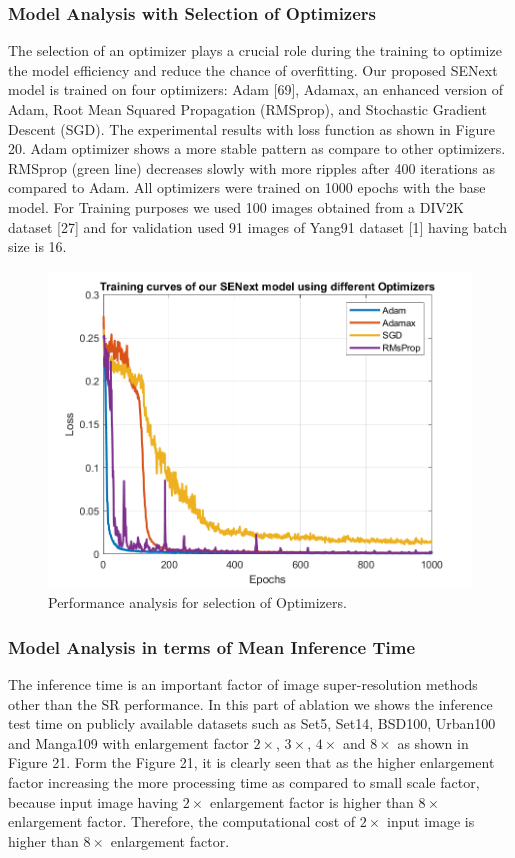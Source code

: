 \documentclass{ieeeaccess}
\begin{document}
\subsubsection{Model Analysis with Selection of Optimizers}
The selection of an optimizer plays a crucial role during the training to optimize the model efficiency and reduce the chance of overfitting. Our proposed SENext model is trained on four optimizers: Adam [69], Adamax, an enhanced version of Adam, Root Mean Squared Propagation (RMSprop), and Stochastic Gradient Descent (SGD). The experimental results with loss function as shown in Figure 20. Adam optimizer shows a more stable pattern as compare to other optimizers. RMSprop (green line) decreases slowly with more ripples after 400 iterations as compared to Adam. All optimizers were trained on 1000 epochs with the base model. For Training purposes we used 100 images obtained from a DIV2K dataset [27] and for validation used 91 images of Yang91 dataset [1] having batch size is 16.

\begin{figure}[ht]
  \includegraphics[width=\linewidth]{20FIGURE.png}
  \caption{Performance analysis for selection of Optimizers.}
  \label{fig:17}
\end{figure}



\subsubsection{Model Analysis in terms of Mean Inference Time}
The inference time is an important factor of image super-resolution methods other than the SR performance. In this part of ablation we shows the inference test time on publicly available datasets such as Set5, Set14, BSD100, Urban100 and Manga109 with enlargement factor $2\times$, $3\times$, $4\times$ and $8\times$ as shown in Figure 21. Form the Figure 21, it is clearly seen that as the higher enlargement factor increasing the more processing time as compared to small scale factor, because input image having $2\times$ enlargement factor is higher than $8\times$ enlargement factor. Therefore, the computational cost of $2\times$ input image is higher than $8\times$ enlargement factor.
\end{document}
